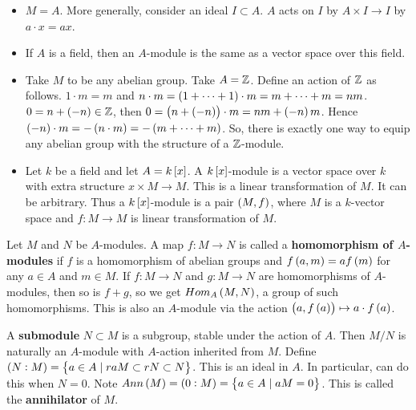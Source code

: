 \begin{example*}
\hfill
\begin{itemize}
\item $ M = A $. More generally, consider an ideal $ I \subset A $. $ A $ acts on $ I $ by $ A \times I \to I $ by $ a \cdot x = ax $.
\item If $ A $ is a field, then an $ A $-module is the same as a vector space over this field.
\item Take $ M $ to be any abelian group. Take $ A = \mathbb{Z} $. Define an action of $ \mathbb{Z} $ as follows. $ 1 \cdot m = m $ and $ n \cdot m = \br{1 + \dots + 1} \cdot m = m + \dots + m = nm $. $ 0 = n + \br{- n} \in \Z $, then $ 0 = \br{n + \br{-n}} \cdot m = nm + \br{-n}m $. Hence $ \br{-n} \cdot m = -\br{n \cdot m} = -\br{m + \dots + m} $. So, there is exactly one way to equip any abelian group with the structure of a $ \mathbb{Z} $-module.
\item Let $ k $ be a field and let $ A = k\sbr{x} $. A $ k\sbr{x} $-module is a vector space over $ k $ with extra structure $ x \times M \to M $. This is a linear transformation of $ M $. It can be arbitrary. Thus a $ k\sbr{x} $-module is a pair $ \br{M, f} $, where $ M $ is a $ k $-vector space and $ f : M \to M $ is linear transformation of $ M $.
\end{itemize}
\end{example*}

\begin{definition}
Let $ M $ and $ N $ be $ A $-modules. A map $ f : M \to N $ is called a \textbf{homomorphism of $ A $-modules} if $ f $ is a homomorphism of abelian groups and $ f\br{a, m} = af\br{m} $ for any $ a \in A $ and $ m \in M $. If $ f : M \to N $ and $ g : M \to N $ are homomorphisms of $ A $-modules, then so is $ f + g $, so we get $ Hom_A\br{M, N} $, a group of such homomorphisms. This is also an $ A $-module via the action $ \br{a, f\br{a}} \mapsto a \cdot f\br{a} $.
\end{definition}

\begin{definition}
A \textbf{submodule} $ N \subset M $ is a subgroup, stable under the action of $ A $. Then $ M / N $ is naturally an $ A $-module with $ A $-action inherited from $ M $. Define $ \br{N : M} = \cbr{a \in A \mid raM \subset rN \subset N} $. This is an ideal in $ A $. In particular, can do this when $ N = 0 $. Note $ Ann\br{M} = \br{0 : M} = \cbr{a \in A \mid aM = 0} $. This is called the \textbf{annihilator} of $ M $.
\end{definition}

